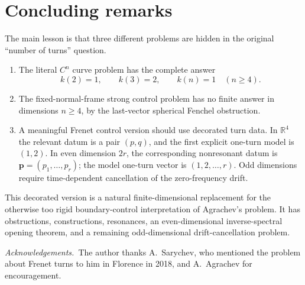 \documentclass[11pt,reqno]{amsart}
\theoremstyle{definition}
\theoremstyle{remark}
\newcommand{\R}{\mathbb R}
\begin{document}
\section{Concluding remarks}

The main lesson is that three different problems are hidden in the original ``number
of turns'' question.
\begin{enumerate}[label=\textup{(\arabic*)}]
\item The literal $C^n$ curve problem has the complete answer
\[
        k(2)=1,
        \qquad
        k(3)=2,
        \qquad
        k(n)=1\quad(n\ge4).
\]
\item The fixed-normal-frame strong control problem has no finite answer in
dimensions $n\ge4$, by the last-vector spherical Fenchel obstruction.
\item A meaningful Frenet control version should use decorated turn data.  In
$\R^4$ the relevant datum is a pair $(p,q)$, and the first explicit one-turn model is
$(1,2)$.  In even dimension $2r$, the corresponding nonresonant datum is
$\mathbf p=(p_1,\ldots,p_r)$; the model one-turn vector is $(1,2,\ldots,r)$.  Odd
dimensions require time-dependent cancellation of the zero-frequency drift.
\end{enumerate}
This decorated version is a natural finite-dimensional replacement for the
otherwise too rigid boundary-control interpretation of Agrachev's problem.  It has
obstructions, constructions, resonances, an even-dimensional inverse-spectral
opening theorem, and a remaining odd-dimensional drift-cancellation problem.

\smallskip\noindent
\emph{Acknowledgements.} The author thanks A.~Sarychev, who mentioned the problem about Frenet turns to him in Florence in 2018, and A.~Agrachev for encouragement. 
\end{document}
